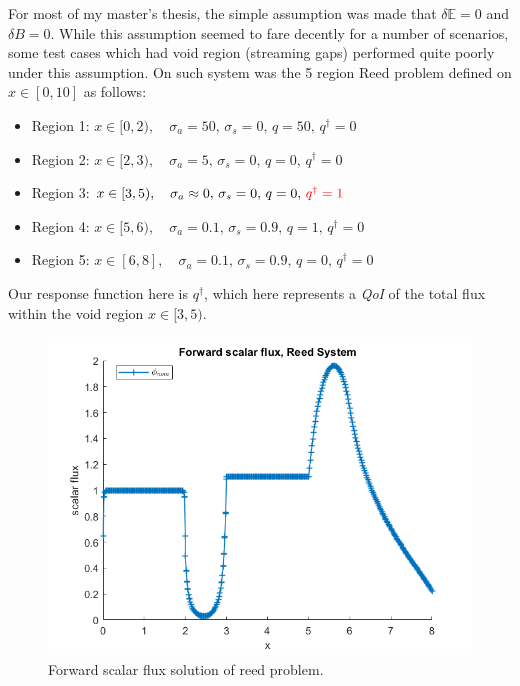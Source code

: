 \documentclass{article}
\newcommand{\Edd}{\mathbb{E}}
\newcommand{\BEdd}{B}
\newcommand{\sigs}{\sigma_s}
\newcommand{\siga}{\sigma_a}
\newcommand{\qoi}{{\it QoI}\xspace}
\newcommand{\tcr}[1]{\textcolor{red}{#1}}
\begin{document}
For most of my master's thesis, the simple assumption was made that $\delta \Edd=0$ and $\delta \BEdd=0$. While this assumption seemed to fare decently for a number of scenarios, some test cases which had void region (streaming gaps) performed quite poorly under this assumption. On such system was the 5 region Reed problem defined  on $x \in [0,10]$ as follows:
\begin{itemize}
\item Region 1: $x \in [0,2), \quad \siga=50, \, 			\sigs=0, \, q=50, \, q^\dag=0 $
\item Region 2: $x \in [2,3), \quad \siga=5, \, 			\sigs=0, \, q=0, \, q^\dag=0$ 
\item Region 3: $x \in [3,5), \quad \siga \approx 0, \,	\sigs=0, \, q=0, \,  \tcr{q^\dag=1}$
\item Region 4: $x \in [5,6), \quad \siga=0.1, \, 		\sigs=0.9, \, q=1, \, q^\dag=0$
\item Region 5: $x \in [6,8], \quad \siga=0.1, \, 		\sigs=0.9, \, q=0, \, q^\dag=0$
\end{itemize} 
Our response function here is $q^\dag$, which here represents a \qoi of the total flux within the void region $x \in [3,5)$. 
\begin{figure}[H]
\centering
  \includegraphics[width=0.6\linewidth]{phi_reed.png}
  \caption{Forward scalar flux solution of reed problem.}
\label{fig:phi_reed}
\end{figure}
\end{document}

